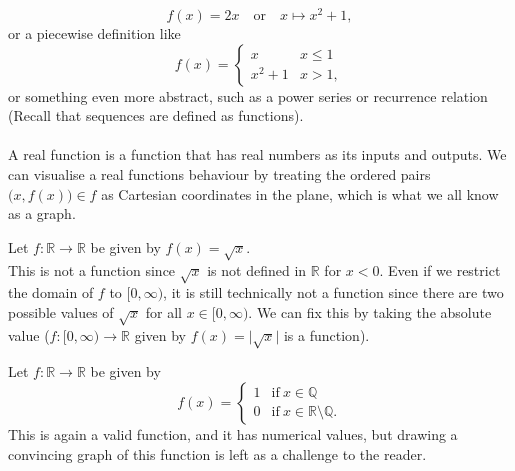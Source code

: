 \documentclass[../real_analysis.tex]{subfiles}
\begin{document}
        \begin{equation*}
            f(x) = 2x \quad \text{or}\quad x \mapsto x^2 + 1,
        \end{equation*}
        or a piecewise definition like
        \begin{equation}\label{eq:4.1}
            f(x) = \begin{cases}
                        x & x \leq 1 \\
                        x^2 + 1 & x > 1,
                    \end{cases}
        \end{equation}
        or something even more abstract, such as a power series or recurrence relation (Recall that sequences are defined as functions).

        \paragraph{}
        A real function is a function that has real numbers as its inputs and outputs. We can visualise a real functions behaviour by treating the ordered pairs $\big(x, f(x)\big) \in f$ as Cartesian coordinates in the plane, which is what we all know as a graph.
        \begin{example}
            Let $f: \mathbb{R} \to \mathbb{R}$ be given by $f(x) = \sqrt{x}$. \\
            This is not a function since $\sqrt{x}$ is not defined in $\mathbb{R}$ for $x<0$. Even if we restrict the domain of $f$ to $[0, \infty)$, it is still technically not a function since there are two possible values of $\sqrt{x}$ for all $x \in [0, \infty)$. We can fix this by taking the absolute value ($f: [0, \infty) \to \mathbb{R}$ given by $f(x) = \lvert\sqrt{x}\rvert$ is a function).
        \end{example}
        \begin{example}
            Let $f: \mathbb{R} \to \mathbb{R}$ be given by
            \[f(x) = \begin{cases}
                        1 & \text{if}\ x \in \mathbb{Q} \\
                        0 & \text{if}\ x \in \mathbb{R}\setminus\mathbb{Q}.
                    \end{cases}\]
            This is again a valid function, and it has numerical values, but drawing a convincing graph of this function is left as a challenge to the reader.
        \end{example}
\end{document}
